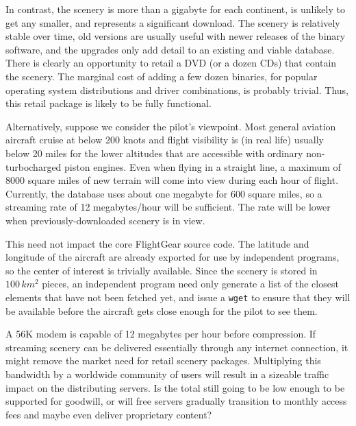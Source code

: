 \documentclass[a4paper,10pt]{article}
\begin{document}
In contrast, the scenery is more than a
gigabyte for each continent, is unlikely to get any smaller,
and represents a significant download.
The scenery is relatively stable over time, old versions are
usually useful with newer releases of the binary software, and
the upgrades only add detail to an existing and viable database.
There is clearly an opportunity to retail a DVD (or a dozen CDs)
that contain the scenery.  The marginal cost of adding a few
dozen binaries, for popular operating system distributions
 and driver combinations, is probably trivial.
Thus, this retail package is likely to be fully functional.

Alternatively, suppose we consider the pilot's viewpoint.  Most general
aviation aircraft cruise at below 200 knots and flight visibility is
(in real life) usually below 20 miles for the lower altitudes that
are accessible with ordinary non-turbocharged piston engines.
Even when flying in a straight line, a maximum of 8000 square miles
of new terrain will come into view during each hour of flight.
Currently, the database uses about one megabyte for 600 square miles,
so a streaming rate of 12 megabytes/hour will be sufficient.
The rate will be lower when previously-downloaded scenery is in view.

This need not impact the core FlightGear source code.  The latitude
and longitude of the aircraft are already exported for use by
independent programs, so the center of interest is trivially available.
Since the scenery is stored in $100\,km^2$ pieces,
an independent program need only generate a
list of the closest elements that have not been fetched yet,
and issue a {\tt wget} to ensure that they will be available
before the aircraft gets close enough for the pilot to see them.

A 56K modem is capable of 12 megabytes per hour before compression.
If streaming scenery can be delivered essentially through any internet
connection, 
it might remove the market need for retail scenery packages.
Multiplying this bandwidth by a worldwide community of users
will result in a sizeable traffic impact on the distributing servers.
Is the total still going to be low enough to be supported
for goodwill, or will free servers gradually transition to 
monthly access fees and maybe even deliver proprietary content?

%
%
\end{document}
